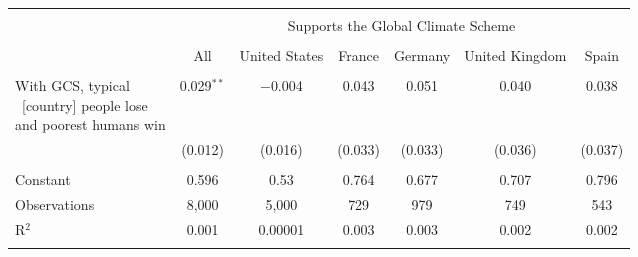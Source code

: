 
\begin{tabular}{@{\extracolsep{5pt}}lcccccc} 
\\[-1.8ex]\hline 
\hline \\[-1.8ex] 
 & \multicolumn{6}{c}{Supports the Global Climate Scheme} \\ 
\cline{2-7} 
\\[-1.8ex] & All & United States & France & Germany & United Kingdom & Spain \\ 
\hline \\[-1.8ex] 
 \makecell{With GCS, typical\\~[country] people lose\\and poorest humans win} & 0.029$^{**}$ & $-$0.004 & 0.043 & 0.051 & 0.040 & 0.038 \\ 
  & (0.012) & (0.016) & (0.033) & (0.033) & (0.036) & (0.037) \\ 
 \hline \\[-1.8ex] 
Constant & 0.596 & 0.53 & 0.764 & 0.677 & 0.707 & 0.796 \\ 
Observations & 8,000 & 5,000 & 729 & 979 & 749 & 543 \\ 
R$^{2}$ & 0.001 & 0.00001 & 0.003 & 0.003 & 0.002 & 0.002 \\ 
\hline 
\hline \\[-1.8ex] 
\end{tabular} 